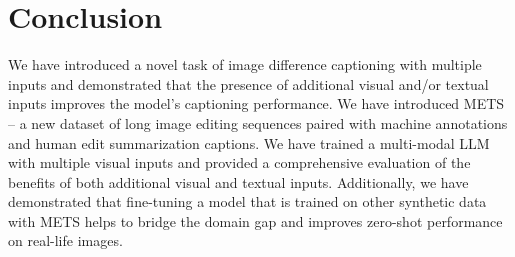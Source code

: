 \documentclass[10pt,twocolumn,letterpaper]{article}
\begin{document}
\section{Conclusion}

We have introduced a novel task of image difference captioning with multiple
inputs and demonstrated that the presence of additional visual and/or textual
inputs improves the model's captioning performance. We have introduced METS -- a
new dataset of long image editing sequences paired with machine annotations and
human edit summarization captions. We have trained a multi-modal LLM with
multiple visual inputs and provided a comprehensive evaluation of the benefits
of both additional visual and textual inputs. Additionally, we have demonstrated
that fine-tuning a model that is trained on other synthetic data with METS helps
to bridge the domain gap and improves zero-shot performance on real-life images.



{\small


}
\end{document}
